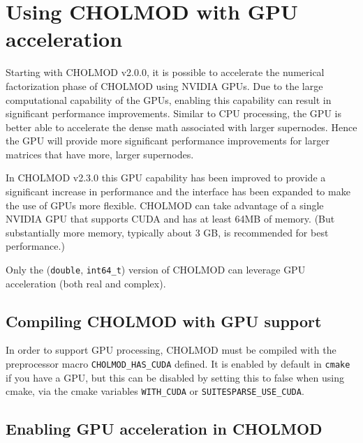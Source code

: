 \documentclass[11pt]{article}
\begin{document}
\section{Using CHOLMOD with GPU acceleration}

Starting with CHOLMOD v2.0.0, it is possible to accelerate the numerical
factorization phase of CHOLMOD using NVIDIA GPUs.  Due to the large
computational capability of the GPUs, enabling this capability can result in
significant performance improvements.  Similar to CPU processing, the GPU is
better able to accelerate the dense math associated with larger supernodes.
Hence the GPU will provide more significant performance improvements for larger
matrices that have more, larger supernodes.

In CHOLMOD v2.3.0 this GPU capability has been improved to provide a
significant increase in performance and the interface has been expanded to make
the use of GPUs more flexible.  CHOLMOD can take advantage of a single NVIDIA
GPU that supports CUDA and has at least 64MB of memory.  (But substantially
more memory, typically about 3 GB, is recommended for best performance.)

Only the ({\tt double}, {\tt int64\_t}) version of CHOLMOD can leverage GPU
acceleration (both real and complex).

\subsection{Compiling CHOLMOD with GPU support}

In order to support GPU processing, CHOLMOD must be compiled with the
preprocessor macro \verb'CHOLMOD_HAS_CUDA' defined.  It is enabled by default
in {\tt cmake} if you have a GPU, but this can be disabled by setting this to
false when using cmake, via the cmake variables \verb'WITH_CUDA'
or \verb'SUITESPARSE_USE_CUDA'.

\subsection{Enabling GPU acceleration in CHOLMOD}
\end{document}
